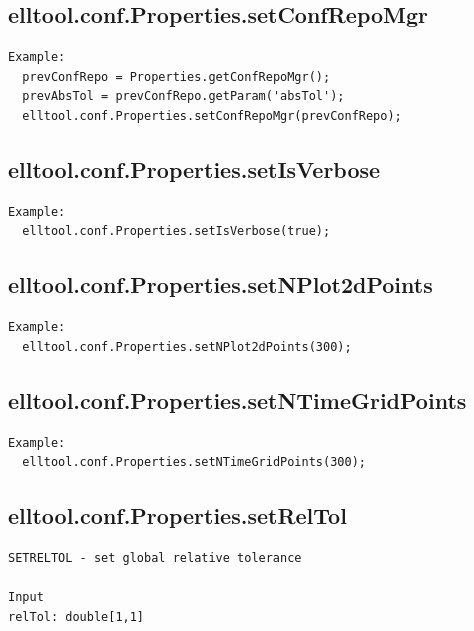 \documentclass[letterpaper,10pt,english]{sphinxmanual}
\begin{document}
\subsection{elltool.conf.Properties.setConfRepoMgr}
\label{chap_functions:elltool-conf-properties-setconfrepomgr}
\begin{Verbatim}[commandchars=\\\{\}]
Example:
  prevConfRepo = Properties.getConfRepoMgr();
  prevAbsTol = prevConfRepo.getParam('absTol');
  elltool.conf.Properties.setConfRepoMgr(prevConfRepo);
\end{Verbatim}


\subsection{elltool.conf.Properties.setIsVerbose}
\label{chap_functions:elltool-conf-properties-setisverbose}
\begin{Verbatim}[commandchars=\\\{\}]
Example:
  elltool.conf.Properties.setIsVerbose(true);
\end{Verbatim}


\subsection{elltool.conf.Properties.setNPlot2dPoints}
\label{chap_functions:elltool-conf-properties-setnplot2dpoints}
\begin{Verbatim}[commandchars=\\\{\}]
Example:
  elltool.conf.Properties.setNPlot2dPoints(300);
\end{Verbatim}


\subsection{elltool.conf.Properties.setNTimeGridPoints}
\label{chap_functions:elltool-conf-properties-setntimegridpoints}
\begin{Verbatim}[commandchars=\\\{\}]
Example:
  elltool.conf.Properties.setNTimeGridPoints(300);
\end{Verbatim}


\subsection{elltool.conf.Properties.setRelTol}
\label{chap_functions:elltool-conf-properties-setreltol}
\begin{Verbatim}[commandchars=\\\{\}]
SETRELTOL - set global relative tolerance

Input
relTol: double[1,1]
\end{Verbatim}
\end{document}
